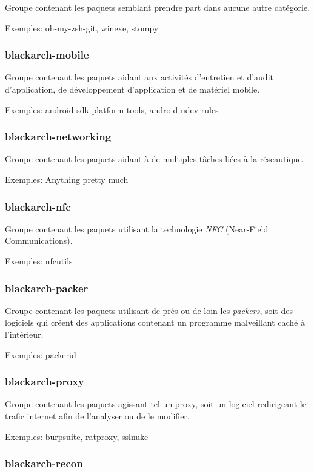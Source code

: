 \documentclass[a4paper, oneside, 11pt]{book}
\begin{document}
Groupe contenant les paquets semblant prendre part dans aucune autre
catégorie.

Exemples: oh-my-zsh-git, winexe, stompy

\subsubsection{blackarch-mobile}

Groupe contenant les paquets aidant aux activités d'entretien et d'audit
d'application, de développement d'application et de matériel mobile.

Exemples: android-sdk-platform-tools, android-udev-rules

\subsubsection{blackarch-networking}

Groupe contenant les paquets aidant à de multiples tâches liées à la réseautique.

Exemples: Anything pretty much

\subsubsection{blackarch-nfc}

Groupe contenant les paquets utilisant la technologie \textit{NFC} (Near-Field
Communications).

Exemples: nfcutils

\subsubsection{blackarch-packer}

Groupe contenant les paquets utilisant de près ou de loin les \textit{packers},
soit des logiciels qui créent des applications contenant un programme
malveillant caché à l'intérieur.

Exemples: packerid

\subsubsection{blackarch-proxy}

Groupe contenant les paquets agissant tel un proxy, soit un logiciel redirigeant
le trafic internet afin de l'analyser ou de le modifier.

Exemples: burpsuite, ratproxy, sslnuke

\subsubsection{blackarch-recon}
\end{document}
